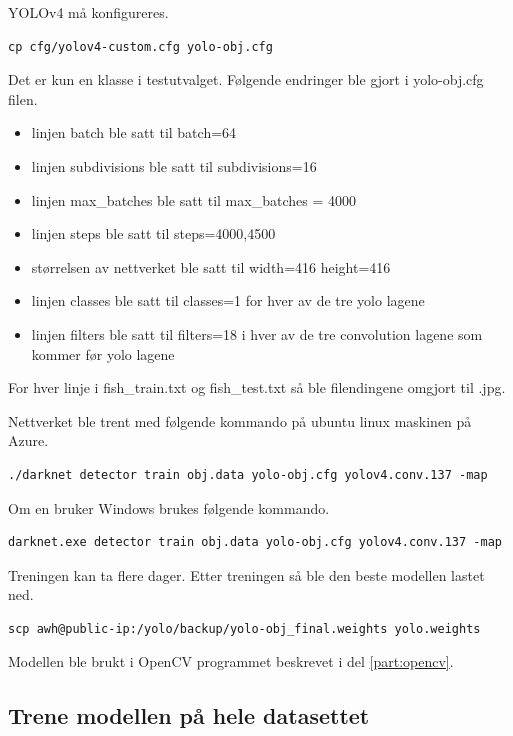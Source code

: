 YOLOv4 må konfigureres.

\begin{verbatim}
cp cfg/yolov4-custom.cfg yolo-obj.cfg
\end{verbatim}

Det er kun en klasse i testutvalget. Følgende endringer ble gjort i yolo-obj.cfg filen.

\begin{itemize}
  \item linjen batch ble satt til batch=64
  \item linjen subdivisions ble satt til subdivisions=16
  \item linjen max\_batches ble satt til max\_batches = 4000
  \item linjen steps ble satt til steps=4000,4500
  \item størrelsen av nettverket ble satt til width=416 height=416
  \item linjen classes ble satt til classes=1 for hver av de tre yolo lagene
  \item linjen filters ble satt til filters=18 i hver av de tre convolution lagene som kommer før yolo lagene
\end{itemize}

For hver linje i fish\_train.txt og fish\_test.txt så ble filendingene omgjort til .jpg.

Nettverket ble trent med følgende kommando på ubuntu linux maskinen på Azure.

\begin{verbatim}
./darknet detector train obj.data yolo-obj.cfg yolov4.conv.137 -map
\end{verbatim}

Om en bruker Windows brukes følgende kommando.

\begin{verbatim}
darknet.exe detector train obj.data yolo-obj.cfg yolov4.conv.137 -map
\end{verbatim}

Treningen kan ta flere dager. Etter treningen så ble den beste modellen lastet ned.

\begin{verbatim}
scp awh@public-ip:/yolo/backup/yolo-obj_final.weights yolo.weights
\end{verbatim}

Modellen ble brukt i OpenCV programmet beskrevet i del \ref{part:opencv}. 

\subsection{Trene modellen på hele datasettet}

